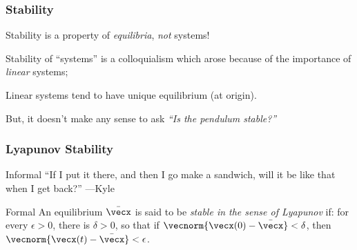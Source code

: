 \documentclass[12pt]{beamer}
\begin{document}
\begin{frame}
\frametitle{Stability}

\begin{itemize}

\vitem Stability is a property of \emph{equilibria}, \emph{not} systems!

\vitem Stability of ``systems'' is a colloquialism which arose because of the importance of \emph{linear} systems;

\vitem Linear systems tend to have unique equilibrium (at origin).

\vitem But, it doesn't make any sense to ask \emph{``Is the pendulum stable?''}

\end{itemize}

\end{frame}



\begin{frame}
\frametitle{Lyapunov Stability}
\vfill
\begin{block}{Informal}
``If I put it there, and then I go make a sandwich, will it be like that when I get back?''
---Kyle
\end{block}

\vfill
\begin{block}{Formal}
An equilibrium $\bar\vecx$ is said to be \emph{stable in the sense of Lyapunov} if:
for every $\epsilon > 0$, there is $\delta >0$, so that
if $\vecnorm{\vecx(0)-\bar\vecx} < \delta$, then
$\vecnorm{\vecx(t) - \bar\vecx} < \epsilon$. 
\end{block}

\vfill\null

\end{frame}
\end{document}
